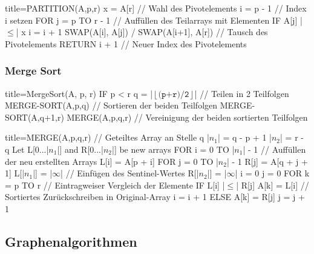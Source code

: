             \begin{ccode}[autogobble,escapeinside=||]{title={PARTITION(A,p,r)}}
            x = A[r]    // Wahl des Pivotelements
            i = p - 1   // Index i setzen
            FOR j = p TO r - 1 // Auffüllen des Teilarrays mit Elementen
                IF A[j] |$\leq$| x
                    i = i + 1
                    SWAP(A[i], A[j]) /
            SWAP(A[i+1], A[r]) // Tausch des Pivotelements
            RETURN i + 1 // Neuer Index des Pivotelements
            \end{ccode}

        \subsubsection{Merge Sort}
            \begin{ccode}[autogobble,escapeinside=||]{title={MergeSort(A, p, r)}}
            IF p < r
                q = |$\left \lfloor \texttt{(p+r)/2} \right \rfloor$| // Teilen in 2 Teilfolgen 
                MERGE-SORT(A,p,q) // Sortieren der beiden Teilfolgen
                MERGE-SORT(A,q+1,r)
                MERGE(A,p,q,r) // Vereinigung der beiden sortierten Teilfolgen
            \end{ccode}
        
            \begin{ccode}[autogobble,escapeinside=||]{title={MERGE(A,p,q,r)}}
            // Geteiltes Array an Stelle q
            |$n_1$| = q - p + 1
            |$n_2$| = r - q 
            Let L[0...|$n_1$|] and R[0...|$n_2$|] be new arrays 
            FOR i = 0 TO |$n_1$| - 1 // Auffüllen der neu erstellten Arrays
                L[i] = A[p + i]
            FOR j = 0 TO |$n_2$| - 1
                R[j] = A[q + j + 1]
            L[|$n_1$|] = |$\infty$| // Einfügen des Sentinel-Wertes
            R[|$n_2$|] = |$\infty$|
            i = 0
            j = 0
            FOR k = p TO r  // Eintragweiser Vergleich der Elemente          
                IF L[i] |$\leq$| R[j]
                    A[k] = L[i] // Sortiertes Zurückschreiben in Original-Array
                    i = i + 1
                ELSE 
                    A[k] = R[j]
                    j = j + 1
            \end{ccode}

    \subsection{Graphenalgorithmen}
